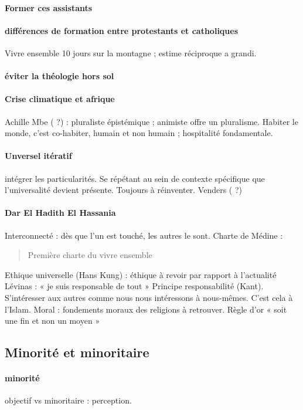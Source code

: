 \paragraph{Former ces assistants}
\paragraph{différences de formation entre protestants et catholiques} Vivre ensemble 10 jours sur la montagne ; estime réciproque a grandi. 
\paragraph{éviter la théologie hors sol} 

\paragraph{Crise climatique et afrique} Achille Mbe ( ?) : pluraliste épistémique ; animiste offre un pluralisme. Habiter le monde, c’est co-habiter, humain et non humain ; hospitalité fondamentale. 

\paragraph{Unversel itératif} intégrer les particularités. Se répétant au sein de contexte spécifique que l’universalité devient présente. Toujours  à réinventer. Venders ( ?)

\paragraph{Dar El Hadith El Hassania} Interconnecté : dès que l’un est touché, les autres le sont.
Charte de Médine : 
\begin{quote}
Première charte du vivre ensemble
\end{quote}
Ethique universelle (Hans Kung) : éthique à revoir par rapport à l’actualité
Lévinas : « je suis responsable de tout »
Principe responsabilité (Kant). S’intéresser aux autres comme nous nous intéressons à nous-mêmes. C’est cela à l’Islam. 
Moral : fondements moraux des religions à retrouver.
Règle d’or « soit une fin et non un moyen »

\subsection{Minorité et minoritaire}

\paragraph{minorité} objectif vs minoritaire : perception. 

